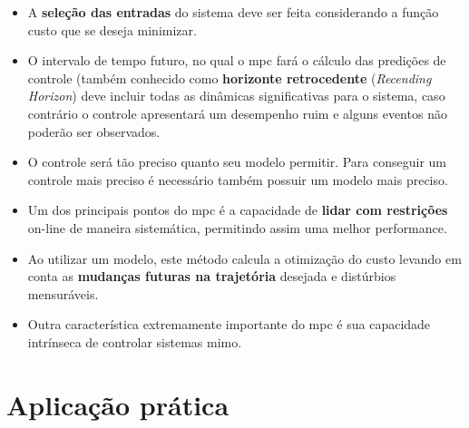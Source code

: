 \begin{itemize}
    \item A \textbf{seleção das entradas} do sistema deve ser feita considerando a função custo que se
            deseja minimizar.

    \item O intervalo de tempo futuro, no qual o \acrshort{mpc} fará o cálculo das predições de controle
            (também conhecido como \textbf{horizonte retrocedente} (\textit{Recending Horizon}) deve
            incluir todas as dinâmicas significativas para o sistema, caso contrário o controle apresentará
            um desempenho ruim e alguns eventos não poderão ser observados.

    \item O controle será tão preciso quanto seu modelo permitir. Para conseguir um controle mais preciso
            é necessário também possuir um modelo mais preciso.

    \item Um dos principais pontos do \acrshort{mpc} é a capacidade de \textbf{lidar com restrições} on-line
            de maneira sistemática, permitindo assim uma melhor performance.

    \item Ao utilizar um modelo, este método calcula a otimização do custo levando em conta as
            \textbf{mudanças futuras na trajetória} desejada e distúrbios mensuráveis.

    \item Outra característica extremamente importante do \acrshort{mpc} é sua capacidade intrínseca de
            controlar sistemas \acrshort{mimo}.
    
\end{itemize}


\section{Aplicação prática}
\label{sec:aplicacao_pratica}

